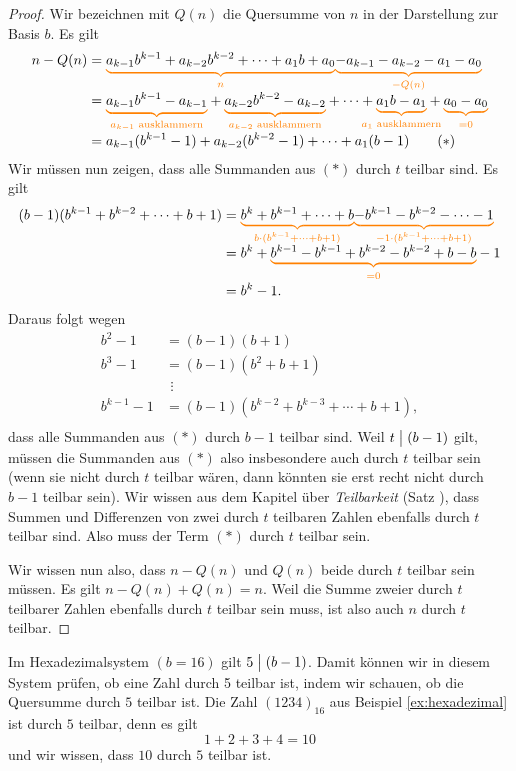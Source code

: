 \documentclass[../../main.tex]{subfiles}
\begin{document}
\begin{proof}
    Wir bezeichnen mit $Q(n)$ die Quersumme von $n$ in der Darstellung zur Basis $b$. Es gilt
    \begin{align*}
        n-Q(n)&=\colorbrace{a_{k-1}b^{k-1}+a_{k-2}b^{k-2}+\dots+a_1b+a_0}{n}\colorbrace{-a_{k-1}-a_{k-2}-a_1-a_0}{-Q(n)}\\
        &=\colorbrace{a_{k-1}b^{k-1}-a_{k-1}}{a_{k-1}\text{ ausklammern}}+\colorbrace{a_{k-2}b^{k-2}-a_{k-2}}{a_{k-2}\text{ ausklammern}}+\dots+\colorbrace{a_1b-a_1}{a_1\text{ ausklammern}}+\colorbrace{a_0-a_0}{=0}\\
        &=a_{k-1}(b^{k-1}-1)+a_{k-2}(b^{k-2}-1)+\dots+a_1(b-1)\tag{$*$}
    \end{align*}
    Wir müssen nun zeigen, dass alle Summanden aus $(*)$ durch $t$ teilbar sind. Es gilt
    \begin{align*}
        (b-1)(b^{k-1}+b^{k-2}+\cdots+b+1)
        &=\colorbrace{b^k+b^{k-1}+\cdots+b}{b\cdot(b^{k-1}+\cdots+b+1)}\colorbrace{-b^{k-1}-b^{k-2}-\cdots-1}{-1\cdot(b^{k-1}+\cdots+b+1)}\\
        &=b^k+\colorbrace{b^{k-1}-b^{k-1}+b^{k-2}-b^{k-2}+b-b}{=0}-1\\
        &=b^k-1.
    \end{align*}
    Daraus folgt wegen
    \begin{align*}
        b^2-1&=(b-1)(b+1)\\
        b^3-1&=(b-1)(b^2+b+1)\\
        &~\,\vdots\\
        b^{k-1}-1&=(b-1)(b^{k-2}+b^{k-3}+\cdots+b+1),\\
    \end{align*}
    dass alle Summanden aus $(*)$ durch $b-1$ teilbar sind. Weil $t\divides (b-1)$ gilt, müssen die Summanden aus $(*)$
    also insbesondere auch durch $t$ teilbar sein (wenn sie nicht durch $t$ teilbar wären, dann könnten sie erst recht
    nicht durch $b-1$ teilbar sein). Wir wissen aus dem Kapitel über \emph{Teilbarkeit} (Satz \mayberef), dass Summen
    und Differenzen von zwei durch $t$ teilbaren Zahlen ebenfalls durch $t$ teilbar sind. Also muss der Term $(*)$ durch
    $t$ teilbar sein. 
    
    Wir wissen nun also, dass $n-Q(n)$ und $Q(n)$ beide durch $t$ teilbar sein müssen. Es gilt $n-Q(n)+Q(n)=n$. Weil die
    Summe zweier durch $t$ teilbarer Zahlen ebenfalls durch $t$ teilbar sein muss, ist also auch $n$ durch $t$ teilbar.
\end{proof}
\begin{example}{}
    Im Hexadezimalsystem $(b=16)$ gilt $5\divides (b-1)$. Damit können wir in diesem System prüfen, ob eine Zahl durch 5
    teilbar ist, indem wir schauen, ob die Quersumme durch $5$ teilbar ist. Die Zahl $(1234)_{16}$ aus Beispiel
    \ref{ex:hexadezimal} ist durch $5$ teilbar, denn es gilt
    \[1+2+3+4=10\]
    und wir wissen, dass $10$ durch $5$ teilbar ist.
\end{example}
\end{document}
